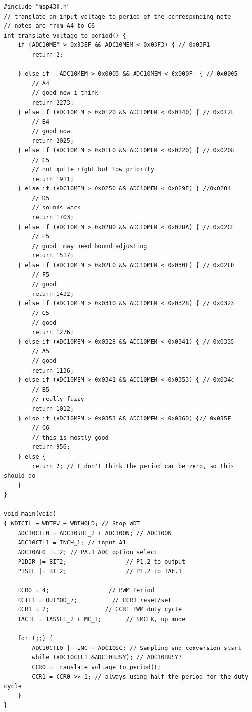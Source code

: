 \documentclass[12pt]{article}
\begin{document}
\begin{lstlisting}
#include "msp430.h"
// translate an input voltage to period of the corresponding note
// notes are from A4 to C6
int translate_voltage_to_period() {
    if (ADC10MEM > 0x03EF && ADC10MEM < 0x03F3) { // 0x03F1
        return 2;

    } else if  (ADC10MEM > 0x0003 && ADC10MEM < 0x000F) { // 0x0005
        // A4
        // good now i think
        return 2273;
    } else if (ADC10MEM > 0x0120 && ADC10MEM < 0x0140) { // 0x012F
        // B4
        // good now
        return 2025;
    } else if (ADC10MEM > 0x01F0 && ADC10MEM < 0x0220) { // 0x0208
        // C5
        // not quite right but low priority
        return 1911;
    } else if (ADC10MEM > 0x0250 && ADC10MEM < 0x029E) { //0x0284
        // D5
        // sounds wack
        return 1703;
    } else if (ADC10MEM > 0x02B0 && ADC10MEM < 0x02DA) { // 0x02CF
        // E5
        // good, may need bound adjusting
        return 1517;
    } else if (ADC10MEM > 0x02E0 && ADC10MEM < 0x030F) { // 0x02FD
        // F5
        // good
        return 1432;
    } else if (ADC10MEM > 0x0310 && ADC10MEM < 0x0328) { // 0x0323
        // G5
        // good
        return 1276;
    } else if (ADC10MEM > 0x0328 && ADC10MEM < 0x0341) { // 0x0335
        // A5
        // good
        return 1136;
    } else if (ADC10MEM > 0x0341 && ADC10MEM < 0x0353) { // 0x034c
        // B5
        // really fuzzy
        return 1012;
    } else if (ADC10MEM > 0x0353 && ADC10MEM < 0x036D) {// 0x035F
        // C6
        // this is mostly good
        return 956;
    } else {
        return 2; // I don't think the period can be zero, so this should do
    }
}

void main(void)
{ WDTCTL = WDTPW + WDTHOLD; // Stop WDT
    ADC10CTL0 = ADC10SHT_2 + ADC10ON; // ADC10ON
    ADC10CTL1 = INCH_1; // input A1
    ADC10AE0 |= 2; // PA.1 ADC option select
    P1DIR |= BIT2;                 // P1.2 to output
    P1SEL |= BIT2;                 // P1.2 to TA0.1

    CCR0 = 4;                 // PWM Period
    CCTL1 = OUTMOD_7;          // CCR1 reset/set
    CCR1 = 2;                // CCR1 PWM duty cycle
    TACTL = TASSEL_2 + MC_1;       // SMCLK, up mode

    for (;;) {
        ADC10CTL0 |= ENC + ADC10SC; // Sampling and conversion start
        while (ADC10CTL1 &ADC10BUSY); // ADC10BUSY?
        CCR0 = translate_voltage_to_period();
        CCR1 = CCR0 >> 1; // always using half the period for the duty cycle
    }
}

\end{lstlisting}
\end{document}
